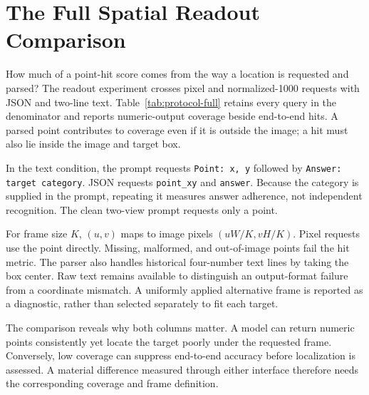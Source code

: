 \section{The Full Spatial Readout Comparison}
\label{app:readout}

How much of a point-hit score comes from the way a location is requested and
parsed? The readout experiment crosses pixel and normalized-1000 requests with
JSON and two-line text. Table~\ref{tab:protocol-full} retains every query in the
denominator and reports numeric-output coverage beside end-to-end hits. A
parsed point contributes to coverage even if it is outside the image; a hit
must also lie inside the image and target box.

In the text condition, the prompt requests \texttt{Point: x, y} followed by
\texttt{Answer: target category}. JSON requests \texttt{point\_xy} and
\texttt{answer}. Because the category is supplied in the prompt, repeating it
measures answer adherence, not independent recognition. The clean two-view
prompt requests only a point.

\begin{table}[htbp]
\centering\small
\setlength{\tabcolsep}{3pt}

\caption{Full readout matrix. $V$ counts parsed numeric points among 30 queries;
$H$ is the end-to-end hit percentage over the same 30 queries. The normalized
text rows are exact-ID subsets of the current 80-pair runs; the other rows use
their recorded 30-pair runs.}
\label{tab:protocol-full}
\end{table}

For frame size $K$, $(u,v)$ maps to image pixels $(uW/K,vH/K)$. Pixel requests
use the point directly. Missing, malformed, and out-of-image points fail the
hit metric. The parser also handles historical four-number text lines by taking
the box center. Raw text remains available to distinguish an output-format
failure from a coordinate mismatch. A uniformly applied alternative frame is
reported as a diagnostic, rather than selected separately to fit each target.

The comparison reveals why both columns matter. A model can return numeric
points consistently yet locate the target poorly under the requested frame.
Conversely, low coverage can suppress end-to-end accuracy before localization
is assessed. A material difference measured through either interface therefore
needs the corresponding coverage and frame definition.

